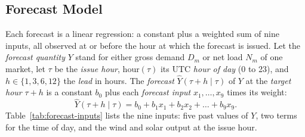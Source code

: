 \documentclass{UNCC-thesis}
\begin{document}
\subsection{Forecast Model}
Each forecast is a linear regression: a constant plus a weighted sum of nine
inputs, all observed at or before the hour at which the forecast is issued.
Let the \emph{forecast quantity} \(Y\) stand for either gross demand \(D_m\)
or net load \(N_m\) of one market, let \(\tau\) be the \emph{issue hour},
\(\mathrm{hour}(\tau)\) its UTC \emph{hour of day} (0 to 23), and
\(h\in\{1,3,6,12\}\) the \emph{lead} in hours. The \emph{forecast}
\(\widehat Y(\tau+h\mid\tau)\) of \(Y\) at the \emph{target hour} \(\tau+h\)
is a constant \(b_0\) plus each \emph{forecast input} \(x_1,\dots,x_9\) times
its weight:
\begin{equation}
  \widehat Y(\tau+h\mid\tau)
  =
  b_0+b_1x_1+b_2x_2+\dots+b_9x_9 .
  \label{eq:forecast-model}
\end{equation}
Table~\ref{tab:forecast-inputs} lists the nine inputs: five past values of
\(Y\), two terms for the time of day, and the wind and solar output at the
issue hour. 
\end{document}
